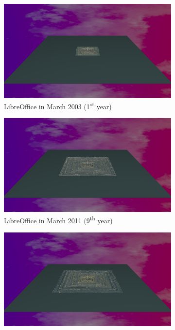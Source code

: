 \begin{figure}[ht]
    \begin{subfigure}{0.48\textwidth}
        \includegraphics[width=\linewidth]{Libreoffice/Animation001.png}
        \caption{LibreOffice in March 2003 (1\textsuperscript{st} year)} 
        \label{fig:Libre_V6_S1}
    \end{subfigure}\hspace*{\fill}
    \begin{subfigure}{0.48\textwidth}
        \includegraphics[width=\linewidth]{Libreoffice/Animation009.png}
        \caption{LibreOffice in March 2011 (9\textsuperscript{th} year)} 
        \label{fig:Libre_V6_S2}
    \end{subfigure}
    \medskip
    \begin{subfigure}{0.48\textwidth}
        \includegraphics[width=\linewidth]{Libreoffice/Animation010.png}

\end{subfigure}
\end{figure}
